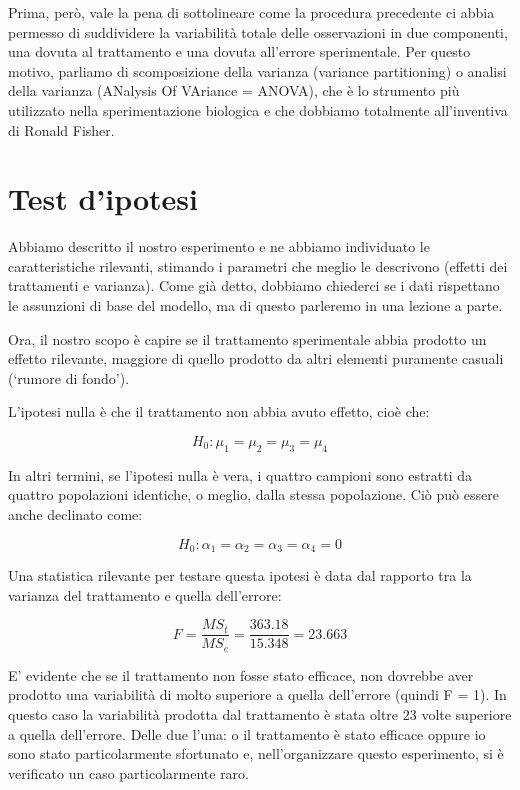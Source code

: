 \documentclass[a4paper,12pt,oneside]{book}
\begin{document}
Prima, però, vale la pena di sottolineare come la procedura precedente ci abbia permesso di suddividere la variabilità totale delle osservazioni in due componenti, una dovuta al trattamento e una dovuta all'errore sperimentale. Per questo motivo, parliamo di scomposizione della varianza (variance partitioning) o analisi della varianza (ANalysis Of VAriance = ANOVA), che è lo strumento più utilizzato nella sperimentazione biologica e che dobbiamo totalmente all'inventiva di Ronald Fisher.

\hypertarget{test-dipotesi}{%
\section{Test d'ipotesi}\label{test-dipotesi}}

Abbiamo descritto il nostro esperimento e ne abbiamo individuato le caratteristiche rilevanti, stimando i parametri che meglio le descrivono (effetti dei trattamenti e varianza). Come già detto, dobbiamo chiederci se i dati rispettano le assunzioni di base del modello, ma di questo parleremo in una lezione a parte.

Ora, il nostro scopo è capire se il trattamento sperimentale abbia prodotto un effetto rilevante, maggiore di quello prodotto da altri elementi puramente casuali (`rumore di fondo').

L'ipotesi nulla è che il trattamento non abbia avuto effetto, cioè che:

\[H_0: \mu_1 = \mu_2 = \mu_3 = \mu_4\]

In altri termini, se l'ipotesi nulla è vera, i quattro campioni sono estratti da quattro popolazioni identiche, o meglio, dalla stessa popolazione. Ciò può essere anche declinato come:

\[H_0: \alpha_1 = \alpha_2 = \alpha_3 = \alpha_4 = 0\]

Una statistica rilevante per testare questa ipotesi è data dal rapporto tra la varianza del trattamento e quella dell'errore:

\[F = \frac{MS_t}{MS_e} = \frac{363.18}{15.348} = 23.663\]

E' evidente che se il trattamento non fosse stato efficace, non dovrebbe aver prodotto una variabilità di molto superiore a quella dell'errore (quindi F = 1). In questo caso la variabilità prodotta dal trattamento è stata oltre 23 volte superiore a quella dell'errore. Delle due l'una: o il trattamento è stato efficace oppure io sono stato particolarmente sfortunato e, nell'organizzare questo esperimento, si è verificato un caso particolarmente raro.
\end{document}
